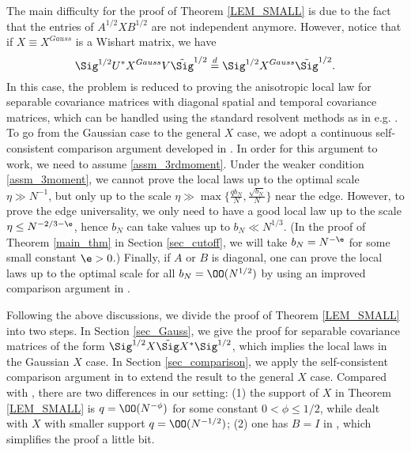 The main difficulty for the proof of Theorem \ref{LEM_SMALL} is due to the fact that the entries of $A^{1/2} XB^{1/2}$ are not independent anymore. However, notice that if $X\equiv X^{Gauss}$ is a Wishart matrix, %
we have 
$$\Sig^{1/2} U^{*}X^{Gauss} V\tilde \Sig^{1/2} \stackrel{d}{=}  \Sig^{1/2} X^{Gauss} \tilde \Sig^{1/2}.$$
In this case, the problem is reduced to proving the anisotropic local law for separable covariance matrices 
with diagonal spatial and temporal covariance matrices, which can be handled using the standard resolvent methods as in e.g. \cite{isotropic,PY}. To go from the Gaussian case to the general $X$ case, we adopt a continuous self-consistent comparison argument developed in \cite{Anisotropic}. In order for this argument to work, we need to assume 
\eqref{assm_3rdmoment}. Under the weaker condition \eqref{assm_3moment}, we cannot prove the local laws up to the optimal scale $\eta \gg N^{-1}$, but only up to the scale $\eta \gg \max\{\frac{qb_N}{N},\frac{\sqrt{b_N}}{N}\}$ near the edge. However, to prove the edge universality, we only need to have a good local law up to the scale $\eta \le N^{-2/3-\e}$, hence $b_N$ can take values up to $b_N \ll N^{1/3}$. (In the proof of Theorem \ref{main_thm} in Section \ref{sec_cutoff}, we will take $b_N=N^{-\e}$ for some small constant $\e>0$.) Finally, if $A$ or $B$ is diagonal, one can prove the local laws up to the optimal scale for all $b_N=\OO( N^{1/2})$ by using an improved comparison argument in \cite{Anisotropic}. 

Following the above discussions, we divide the proof of Theorem \ref{LEM_SMALL} into two steps. In Section \ref{sec_Gauss}, we give the proof for separable covariance matrices of the form $\Sig^{1/2} X \tilde \Sig X^* \Sig^{1/2}$, which implies the local laws in the Gaussian $X$ case. In Section \ref{sec_comparison}, we apply the self-consistent comparison argument in \cite{Anisotropic} to extend the result to the general $X$ case. Compared with \cite{Anisotropic}, there are two differences in our setting: (1) the support of $X$ in Theorem \ref{LEM_SMALL} is $q=\OO(N^{-\phi})$ for some constant $0<\phi \le 1/2$, while \cite{Anisotropic} dealt with $X$ with smaller support $q=\OO(N^{-1/2})$; (2) one has $B=I$ in \cite{Anisotropic}, which simplifies the proof a little bit.


